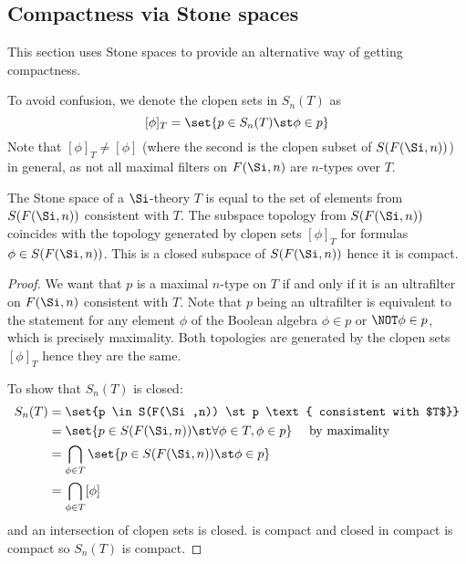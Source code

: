 \subsection{Compactness via Stone spaces}
This section uses Stone spaces to provide an alternative way of getting
compactness.

\begin{nttn}
    To avoid confusion, 
    we denote the clopen sets in $S_n(T)$ as
    \[[\phi]_T = \set{p \in S_n(T) \st \phi \in p}\]
    Note that $[\phi]_T \ne [\phi]$ 
    (where the second is the clopen subset of $S(F(\Si,n))$) in general,
    as not all maximal filters on $F(\Si,n)$ are $n$-types over $T$.
\end{nttn}

\begin{prop}
    The Stone space of a $\Si$-theory $T$ is equal to the
    set of elements from $S(F(\Si,n))$ consistent with $T$.
    The subspace topology from $S(F(\Si,n))$ coincides with the 
    topology generated by clopen sets $[\phi]_T$ for formulas 
    $\phi \in S(F(\Si,n))$.
    This is a closed subspace of $S(F(\Si,n))$ hence it is compact.
\end{prop}
\begin{proof}
    We want that $p$ is a maximal $n$-type on $T$ if and only if 
    it is an ultrafilter on $F(\Si,n)$ consistent with $T$.
    Note that $p$ being an ultrafilter is equivalent to the statement
    for any element $\phi$ of the Boolean algebra 
    $\phi \in p$ or $\NOT \phi \in p$, which is precisely maximality.
    Both topologies are generated by the clopen sets $[\phi]_T$
    hence they are the same.
    
    To show that $S_n(T)$ is closed:
    \begin{align*}
        S_n(T) &= 
        \set{p \in S(F(\Si,n)) \st p \text{ consistent with $T$}}\\
        &= \set{p \in S(F(\Si,n)) \st \forall \phi \in T, \phi \in p} 
        \quad \text{ by maximality}\\
        &= \bigcap_{\phi \in T}\set{p  \in S(F(\Si,n)) \st \phi \in p}\\
        &= \bigcap_{\phi \in T}[\phi]
    \end{align*}
    and an intersection of clopen sets is closed. 
     is compact and 
    closed in compact is compact so $S_n(T)$ is compact.
\end{proof}

